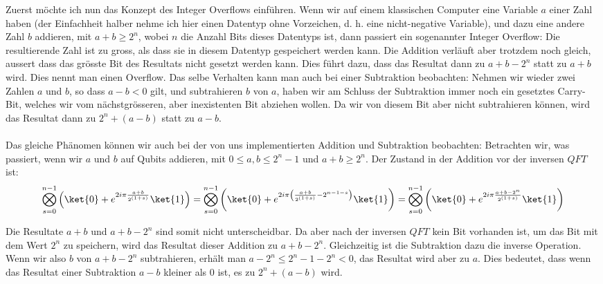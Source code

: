 Zuerst möchte ich nun das Konzept des Integer Overflows einführen. Wenn wir auf einem klassischen Computer eine Variable $a$ einer Zahl haben (der Einfachheit halber nehme ich hier einen Datentyp ohne Vorzeichen, d. h. eine nicht-negative Variable), und dazu eine andere Zahl $b$ addieren, mit $a + b \geq 2^n$, wobei $n$ die Anzahl Bits dieses Datentyps ist, dann passiert ein sogenannter Integer Overflow: Die resultierende Zahl ist zu gross, als dass sie in diesem Datentyp gespeichert werden kann. Die Addition verläuft aber trotzdem noch gleich, aussert dass das grösste Bit des Resultats nicht gesetzt werden kann. Dies führt dazu, dass das Resultat dann zu $a + b - 2^n$ statt zu $a + b$ wird. 
Dies nennt man einen Overflow. Das selbe Verhalten kann man auch bei einer Subtraktion beobachten: Nehmen wir wieder zwei Zahlen $a$ und $b$, so dass $a - b < 0$ gilt, und subtrahieren $b$ von $a$, haben wir am Schluss der Subtraktion immer noch ein gesetztes Carry-Bit, welches wir vom nächstgrösseren, aber inexistenten Bit abziehen wollen. Da wir von diesem Bit aber nicht subtrahieren können, wird das Resultat dann zu $2^n + (a - b)$ statt zu $a - b$.

\paragraph{}
Das gleiche Phänomen können wir auch bei der von uns implementierten Addition und Subtraktion beobachten: Betrachten wir, was passiert, wenn wir $a$ und $b$ auf Qubits addieren, mit $0 \leq a, b \leq 2^n - 1$ und $a + b \geq 2^n$. Der Zustand in der Addition vor der inversen $QFT$ ist: $$\bigotimes_{s = 0}^{n - 1}{\left( \ket{0} + e^{2i\pi\frac{a + b}{2^{(1 + s)}}}\ket{1} \right)} = \bigotimes_{s = 0}^{n - 1}{\left(\ket{0} + e^{2i\pi\left(\frac{a + b}{2^{(1 + s)}} - 2^{n - 1 - s}\right)}\ket{1} \right)} = \bigotimes_{s = 0}^{n - 1}{\left( \ket{0} + e^{2i\pi\frac{a + b - 2^n}{2^{(1 + s)}}}\ket{1} \right)}$$

Die Resultate $a + b$ und $a + b - 2^n$ sind somit nicht unterscheidbar. Da aber nach der inversen $QFT$ kein Bit vorhanden ist, um das Bit mit dem Wert $2^n$ zu speichern, wird das Resultat dieser Addition zu $a + b - 2^n$. Gleichzeitig ist die Subtraktion dazu die inverse Operation. Wenn wir also $b$ von $a + b - 2^n$ subtrahieren, erhält man $a - 2^n \leq 2^n - 1 - 2^n < 0$, das Resultat wird aber zu $a$. Dies bedeutet, dass wenn das Resultat einer Subtraktion $a - b$ kleiner als $0$ ist, es zu $2^n + (a - b)$ wird.


